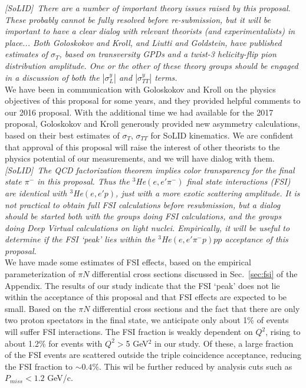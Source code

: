 {\it [SoLID]\ There are a number of important theory issues raised by this
  proposal.  These probably cannot be fully resolved before re-submission, but
  it will be important to have a clear dialog with relevant theorists (and
  experimentalists) in place...  Both Goloskokov and Kroll, and Liutti and
  Goldstein, have published estimates of $\sigma_T$, based on transversity GPDs
  and a twist-3 helicity-flip pion distribution amplitude.  One or the other of
  these theory groups should be engaged in a discussion of both the
  $|\sigma^y_L|$ and $|\sigma^y_{TT}|$ terms.}\\[0.2ex]

We have been in communication with Goloskokov and Kroll on the physics
objectives of this proposal for some years, and they provided helpful comments
to our 2016 proposal.  With the additional time we had available for the 2017
proposal, Goloskokov and Kroll generously provided new asymmetry calculations,
based on their best estimates of $\sigma_T$, $\sigma_{TT}$ for SoLID
kinematics.  We are confident that approval of this proposal will raise the
interest of other theorists to the physics potential of our measurements, and
we will have dialog with them.\\[0.2ex]

{\it [SoLID]\ The QCD factorization theorem implies color transparency for the
  final state $\pi^-$ in this proposal.  Thus the $^3$He$(e,e'\pi^-)$ final
  state interactions (FSI) are identical with $^3$He$(e,e'p)$, just with a more
  exotic scattering amplitude.  It is not practical to obtain full FSI
  calculations before resubmission, but a dialog should be started both with
  the groups doing FSI calculations, and the groups doing Deep Virtual
  calculations on light nuclei.  Empirically, it will be useful to determine if
  the FSI `peak' lies within the $^3$He$(e,e'\pi^-p)pp$ acceptance of this
  proposal.}\\[0.2ex]

We have made some estimates of FSI effects, based on the empirical
parameterization of $\pi N$ differential cross sections discussed in
Sec.~\ref{sec:fsi} of the Appendix.  The results of our study indicate that the
FSI `peak' does not lie within the acceptance of this proposal and that FSI
effects are expected to be small.  Based on the $\pi N$ differential cross
sections and the fact that there are only two proton spectators in the final
state, we anticipate only about 1\% of events will suffer FSI interactions.
The FSI fraction is weakly dependent on $Q^2$, rising to about 1.2\% for events
with $Q^2>$5 GeV$^2$ in our study.  Of these, a large fraction of the FSI
events are scattered outside the triple coincidence acceptance, reducing the
FSI fraction to $\sim 0.4\%$.  This wil be further reduced by analysis cuts
such as $P_{miss}<1.2$ GeV/c.

